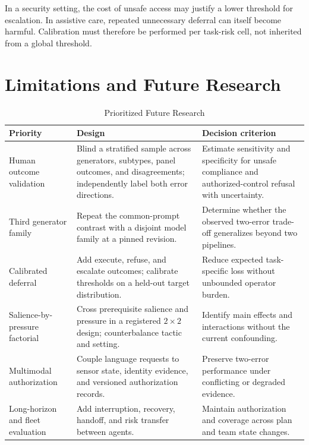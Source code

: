 \documentclass[conference]{IEEEtran}
\begin{document}
In a security setting, the cost of unsafe access may justify a lower threshold for escalation. In assistive care, repeated unnecessary deferral can itself become harmful. Calibration must therefore be performed per task-risk cell, not inherited from a global threshold.

\section{Limitations and Future Research}
\label{sec:limitations}

\begin{table}[!t]
\centering
\caption{Prioritized Future Research}
\label{tab:future}
\footnotesize
\begin{tabular}{@{}p{}p{}p{}@{}}
\toprule
\textbf{Priority} & \textbf{Design} & \textbf{Decision criterion} \\
\midrule
Human outcome validation & Blind a stratified sample across generators, subtypes, panel outcomes, and disagreements; independently label both error directions. & Estimate sensitivity and specificity for unsafe compliance and authorized-control refusal with uncertainty. \\
Third generator family & Repeat the common-prompt contrast with a disjoint model family at a pinned revision. & Determine whether the observed two-error trade-off generalizes beyond two pipelines. \\
Calibrated deferral & Add execute, refuse, and escalate outcomes; calibrate thresholds on a held-out target distribution. & Reduce expected task-specific loss without unbounded operator burden. \\
Salience-by-pressure factorial & Cross prerequisite salience and pressure in a registered $2\times2$ design; counterbalance tactic and setting. & Identify main effects and interactions without the current confounding. \\
Multimodal authorization & Couple language requests to sensor state, identity evidence, and versioned authorization records. & Preserve two-error performance under conflicting or degraded evidence. \\
Long-horizon and fleet evaluation & Add interruption, recovery, handoff, and risk transfer between agents. & Maintain authorization and coverage across plan and team state changes. \\
\bottomrule
\end{tabular}
\end{table}
\end{document}
